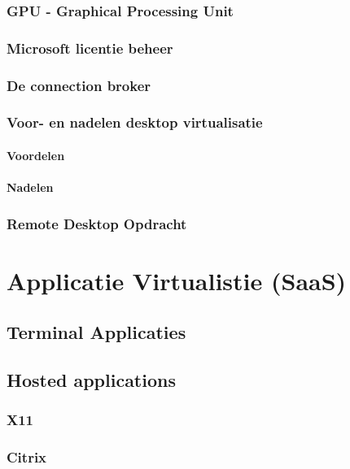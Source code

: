 \documentclass[a4paper,12pt,twoside,openright,titlepage]{book}
\begin{document}
\subsection{GPU - Graphical Processing Unit}

\subsection{Microsoft licentie beheer}

\subsection{De connection broker}

\subsection{Voor- en nadelen desktop virtualisatie}
\subsubsection{Voordelen}

\subsubsection{Nadelen}

\subsection{Remote Desktop Opdracht}


\chapter{Applicatie Virtualistie (SaaS)}

\section{Terminal Applicaties}

\section{Hosted applications}

\subsection{X11}

\subsection{Citrix}


\end{document}
